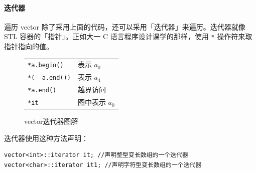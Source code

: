 \documentclass[UTF8]{ctexart}
\begin{document}
\paragraph{迭代器} 遍历 vector 除了采用上面的代码，还可以采用「迭代器」来遍历。迭代器就像 STL 容器的「指针」。正如大一 C 语言程序设计课学的那样，使用 \verb!*! 操作符来取指针指向的值。

\begin{figure}[htb]
  \begin{minipage}[t]{.5\textwidth}
  \centering
  \vspace{0pt}
  \end{minipage}
  \begin{minipage}[t]{.48\textwidth}
      \vspace{0pt}
      \centering
      \begin{tabular}{ll}
        \verb!*a.begin()! & 表示 $a_0$ \\
        \verb!*(--a.end())! & 表示 $a_4$ \\
        \verb!*a.end()! & 越界访问 \\
        \verb!*it! & 图中表示 $a_0$ \\
      \end{tabular}
  \end{minipage}
 
%
%  
  \caption{vector迭代器图解}\label{fig:vector-iterator}
\end{figure}

迭代器使用这种方法声明：
\begin{lstlisting}[numbers=none]
vector<int>::iterator it; //声明整型变长数组的一个迭代器
vector<char>::iterator it1; //声明字符型变长数组的一个迭代器
\end{lstlisting}
\end{document}
